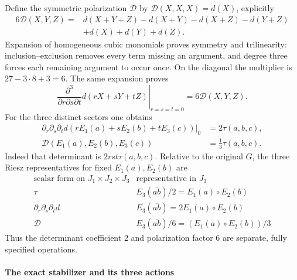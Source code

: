 Define the symmetric polarization $\mathcal D$ by
$\mathcal D(X,X,X)=d(X)$, explicitly
\begin{align}
 6\mathcal D(X,Y,Z)={}&d(X+Y+Z)-d(X+Y)-d(X+Z)-d(Y+Z)
 \nonumber\\&+d(X)+d(Y)+d(Z).
 \label{h24:att:eq:polarization}
\end{align}
Expansion of homogeneous cubic monomials proves symmetry and
trilinearity: inclusion--exclusion removes every term missing an
argument, and degree three forces each remaining argument to occur
once. On the diagonal the multiplier is $27-3\cdot8+3=6$.
The same expansion proves
\[
 \left.\frac{\partial^3}{\partial r\partial s\partial t}
 d(rX+sY+tZ)\right|_{r=s=t=0}=6\mathcal D(X,Y,Z).
\]
For the three distinct sectors one obtains
\begin{equation}
\begin{split}
 \left.\partial_r\partial_s\partial_t
 d(rE_1(a)+sE_2(b)+tE_3(c))\right|_0&=2\tau(a,b,c),\\
 \mathcal D(E_1(a),E_2(b),E_3(c))&=\tfrac13\tau(a,b,c).
\end{split}
 \label{h24:att:eq:factor-six}
\end{equation}
Indeed that determinant is $2rst\tau(a,b,c)$. Relative to the original
$G$, the three Riesz representatives for fixed $E_1(a),E_2(b)$ are
\[
\begin{array}{c|c}
\text{scalar form on }J_1\times J_2\times J_3&
             \text{representative in }J_3\\\hline
\tau&E_3(\overline{ab})/2=E_1(a)\circ E_2(b)\\
\partial_r\partial_s\partial_t d&
                  E_3(\overline{ab})=2E_1(a)\circ E_2(b)\\
\mathcal D&E_3(\overline{ab})/6=(E_1(a)\circ E_2(b))/3
\end{array}
\]
Thus the determinant coefficient $2$ and polarization factor $6$
are separate, fully specified operations.

\paragraph{The exact stabilizer and its three actions}

